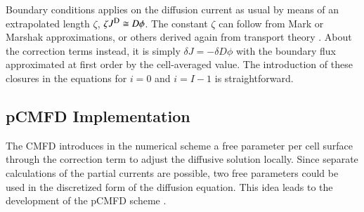 Boundary conditions applies on the diffusion current as usual by means of an extrapolated length $\zeta$, \ie{} $\zeta \jD \cong D \phi$. The constant $\zeta$ can follow from Mark or Marshak approximations, or others derived again from transport theory \cite{meghreblian1960reactor}. About the correction terms instead, it is simply $\delta J = -\delta D \phi$ with the boundary flux approximated at first order by the cell-averaged value. The introduction of these closures in the equations for $i=0$ and $i=I-1$ is straightforward.

\subsection{pCMFD Implementation}
\label{sec:RM-pCMFD}

The CMFD introduces in the numerical scheme a free parameter per cell surface through the correction term to adjust the diffusive solution locally. Since separate calculations of the partial currents are possible, two free parameters could be used in the discretized form of the diffusion equation. This idea leads to the development of the pCMFD scheme \cite{cho2003comparison}.

